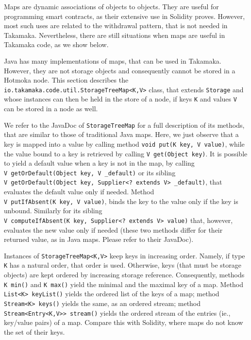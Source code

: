 \documentclass[a4paper,]{book}
\begin{document}
{Maps are dynamic associations of objects to objects. They are useful for
programming smart contracts, as their extensive use in Solidity proves.
However, most such uses are related to the withdrawal pattern, that is
not needed in Takamaka. Nevertheless, there are still situations when
maps are useful in Takamaka code, as we show below.

Java has many implementations of maps, that can be used in Takamaka.
However, they are not storage objects and consequently cannot be stored
in a Hotmoka node. This section describes the
\texttt{io.takamaka.code.util.StorageTreeMap\textless{}K,V\textgreater{}}
class, that extends \texttt{Storage} and whose instances can then be
held in the store of a node, if keys \texttt{K} and values \texttt{V}
can be stored in a node as well.

We refer to the JavaDoc of \texttt{StorageTreeMap} for a full
description of its methods, that are similar to those of traditional
Java maps. Here, we just observe that a key is mapped into a value by
calling method \texttt{void\ put(K\ key,\ V\ value)}, while the value
bound to a key is retrieved by calling \texttt{V\ get(Object\ key)}. It
is possible to yield a default value when a key is not in the map, by
calling \texttt{V\ getOrDefault(Object\ key,\ V\ \_default)} or its
sibling
\texttt{V\ getOrDefault(Object\ key,\ Supplier\textless{}?\ extends\ V\textgreater{}\ \_default)},
that evaluates the default value only if needed. Method
\texttt{V\ putIfAbsent(K\ key,\ V\ value)}, binds the key to the value
only if the key is unbound. Similarly for its sibling
\texttt{V\ computeIfAbsent(K\ key,\ Supplier\textless{}?\ extends\ V\textgreater{}\ value)}
that, however, evaluates the new value only if needed (these two methods
differ for their returned value, as in Java maps. Please refer to their
JavaDoc).

Instances of \texttt{StorageTreeMap\textless{}K,V\textgreater{}} keep
keys in increasing order. Namely, if type \texttt{K} has a natural
order, that order is used. Otherwise, keys (that must be storage
objects) are kept ordered by increasing storage reference. Consequently,
methods \texttt{K\ min()} and \texttt{K\ max()} yield the minimal and
the maximal key of a map. Method
\texttt{List\textless{}K\textgreater{}\ keyList()} yields the ordered
list of the keys of a map; method
\texttt{Stream\textless{}K\textgreater{}\ keys()} yields the same, as an
ordered stream; method
\texttt{Stream\textless{}Entry\textless{}K,V\textgreater{}\textgreater{}\ stream()}
yields the ordered stream of the entries (ie., key/value pairs) of a
map. Compare this with Solidity, where maps do not know the set of their
keys.

}
\end{document}
